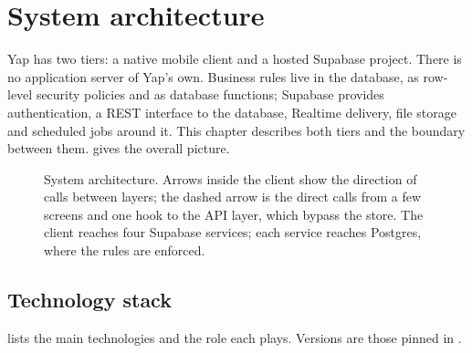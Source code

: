\chapter{System architecture}
\label{ch:architecture}

Yap has two tiers: a native mobile client and a hosted Supabase project. There is no application server
of Yap's own. Business rules live in the database, as row-level security policies and as database
functions; Supabase provides authentication, a REST interface to the database, Realtime delivery,
file storage and scheduled jobs around it. This chapter describes both tiers and the boundary between
them.  gives the overall picture.

\begin{figure}[ht]
  \centering
  
  \caption{System architecture. Arrows inside the client show the direction of calls between layers;
    the dashed arrow is the direct calls from a few screens and one hook to the API layer, which bypass the
    store. The client reaches four Supabase services; each service reaches Postgres, where the rules are
    enforced.}
  \label{fig:architecture}
\end{figure}

\section{Technology stack}

 lists the main technologies and the role each plays. Versions are those pinned in
.

